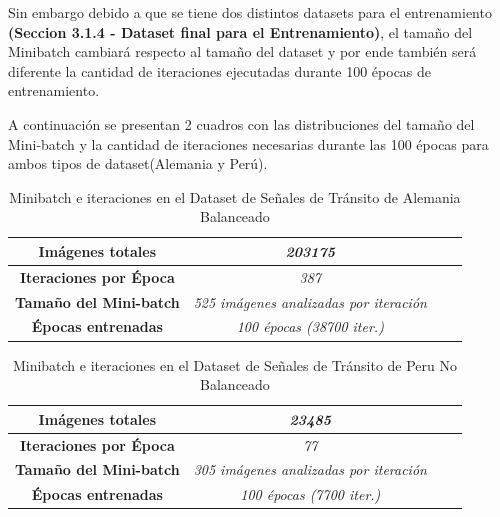 		Sin embargo debido a que se tiene dos distintos datasets para el entrenamiento \textbf{(Seccion 3.1.4 - Dataset final para el Entrenamiento)}, el tamaño del Minibatch cambiará respecto al tamaño del dataset y por ende también será diferente la cantidad de iteraciones ejecutadas durante 100 épocas de entrenamiento. 

		A continuación se presentan 2 cuadros con las distribuciones del tamaño del Mini-batch y la cantidad de iteraciones necesarias durante las 100 épocas para ambos tipos de dataset(Alemania y Perú).                
		

		\begin{table}[H]
			\begin{center}
			\caption{\small{Minibatch e iteraciones en el Dataset de Señales de Tránsito de Alemania Balanceado}}
			\begin{tabular}{|>{\scriptsize}c|>{\scriptsize}c|>{\scriptsize}c|>{\scriptsize}c|}
			\hline
			\textbf{Imágenes totales }                 &\textit{203175}                       \\ \hline
			\textbf{Iteraciones por Época}                 &\textit{387}                             \\ \hline
			\textbf{Tamaño del Mini-batch}                 &\textit{525 imágenes analizadas por iteración}                       \\ \hline
			\textbf{Épocas entrenadas}                &\textit{100 épocas (38700 iter.)}                       \\ \hline
			\end{tabular}
			\end{center}
		\end{table}


		\begin{table}[H]
			\begin{center}
			\caption{\small{Minibatch e iteraciones en el Dataset de Señales de Tránsito de Peru No Balanceado}}
			\begin{tabular}{|>{\scriptsize}c|>{\scriptsize}c|>{\scriptsize}c|>{\scriptsize}c|}
			\hline
			\textbf{Imágenes totales }                 &\textit{23485}                       \\ \hline
			\textbf{Iteraciones por Época}                 &\textit{77}                             \\ \hline
			\textbf{Tamaño del Mini-batch}                 &\textit{305 imágenes analizadas por iteración}                       \\ \hline
			\textbf{Épocas entrenadas}                &\textit{100 épocas (7700 iter.)}                       \\ \hline
			\end{tabular}
			\end{center}
		\end{table}




